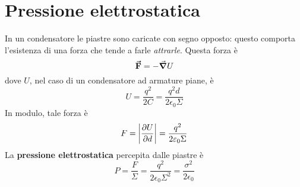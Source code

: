\section{Pressione elettrostatica}
In un condensatore le piastre sono caricate con segno opposto: questo comporta l'esistenza di una forza che tende a farle \textit{attrarle}. Questa forza è
\begin{equation}
	\vb*{\va{F}}=-\grad{U}
\end{equation}
dove $U$, nel caso di un condensatore ad armature piane, è
\begin{equation*}
	U=\frac{q^2}{2C}=\frac{q^2d}{2\epsilon_0\Sigma}
\end{equation*}
In modulo, tale forza è
\begin{equation}
	F=\abs{\pdv{U}{d}}=\frac{q^2}{2\varepsilon_0\Sigma}
\end{equation}
La \textbf{pressione elettrostatica} percepita dalle piastre è
\begin{equation}
	P=\frac{F}{\Sigma}=\frac{q^2}{2\epsilon_0\Sigma^2}=\frac{\sigma^2}{2\epsilon_0}
\end{equation}
